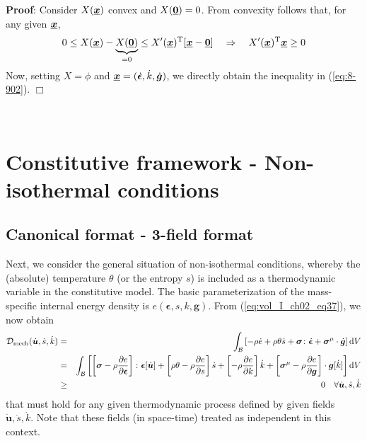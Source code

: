\textbf{Proof}: Consider $X(\underline{\mbox{\boldmath $x$}})$ convex and $X(\underline{\mbox{\boldmath $0$}})=0$. From convexity follows that, for any given $\underline{\mbox{\boldmath $x$}}$,
\begin{equation}
    0 \leq X(\underline{\mbox{\boldmath $x$}}) - \underbrace{X(\underline{\mbox{\boldmath $0$}})}_{=0} \leq X'(\underline{\mbox{\boldmath $x$}})^{\mathrm{T}}[\underline{\mbox{\boldmath $x$}} -\underline{\mbox{\boldmath $0$}}] \quad \Rightarrow \quad X'(\underline{\mbox{\boldmath $x$}})^{\mathrm{T}}\underline{\mbox{\boldmath $x$}}\geq 0
\label{eq:8-202}
\end{equation}
Now, setting $X=\phi$ and $\underline{\mbox{\boldmath $x$}}=(\dot{\bm{\epsilon}},\dot{k},\dot{\bm{g}})$, we directly obtain the inequality in (\ref{eq:8-902}). $\Box$

\


\section{Constitutive framework - Non-isothermal conditions}

\subsection{Canonical format - 3-field format}

Next, we consider the general situation of non-isothermal conditions, whereby the (absolute) temperature $\theta$ (or the entropy $s$) is included as a thermodynamic variable in the constitutive model. The basic parameterization of the mass-specific internal energy density is $e(\bm{\epsilon},s,k,\bm{g})$. From (\ref{eq:vol_I_ch02_eq37}), we now obtain
\begin{eqnarray}
    {\mathcal D}_{\mathrm{mech}}(\dot{\bm{u}},\dot{s},\dot{k})
    &=&
    \int_{\mathcal{B}} \left[-\rho\dot{e} + \rho\theta\dot{s} + \bm{\sigma}\colon\dot{\bm{\epsilon}} + \bm{\sigma}^{\mathrm{\mu}} \cdot \dot{\bm g}\right] \mathop{}\!\mathrm{d} V
    \nonumber \\
    &=&
    \int_{\mathcal{B}} \left[ \left[\bm{\sigma} -\rho\frac{\partial e}{\partial \bm{\epsilon}}\right] \colon \bm{\epsilon}[\dot{\bm{u}}]
    + \left[\rho\theta - \rho\frac{\partial e}{\partial s}  \right] \dot{s}
    + \left[-\rho\frac{\partial e}{\partial k}\right] \dot{k}
    + \left[\bm{\sigma}^{\mathrm{\mu}} -\rho\frac{\partial e}{\partial \bm{g}}\right] \cdot \bm{g}[\dot{k}] \right]\mathop{}\!\mathrm{d} V
    \nonumber \\
    &\geq&  0
    \quad \forall \dot{\bm{u}},\dot{s},\dot{k}
\label{eq:8-201}
\end{eqnarray}
that must hold for any given thermodynamic process defined by given fields $\dot{\bm{u}},\dot{s},\dot{k}$. Note that these fields (in space-time) treated as independent in this context.

